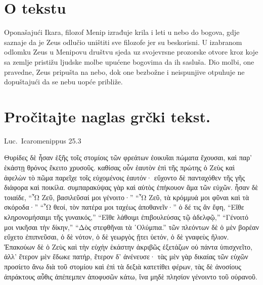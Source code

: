 


\section*{O tekstu}

Oponašajući Ikara, filozof Menip izrađuje krila i leti u nebo do bogova, gdje saznaje da je Zeus odlučio uništiti sve filozofe jer su beskorisni. U izabranom odlomku Zeus u Menipovu društvu sjeda uz svojevrsne prozorske otvore kroz koje sa zemlje pristižu ljudske molbe upućene bogovima da ih sasluša. Dio molbi, one pravedne, Zeus pripušta na nebo, dok one bezbožne i neispunjive otpuhuje ne dopuštajući da se nebu uopće približe.


\section*{Pročitajte naglas grčki tekst.}

Luc.\ Icaromenippus 25.3

\medskip

{\large
\begin{greek}
\noindent Θυρίδες δὲ ἦσαν ἑξῆς τοῖς στομίοις τῶν φρεάτων ἐοικυῖαι πώματα ἔχουσαι, καὶ παρ' ἑκάστῃ θρόνος ἔκειτο χρυσοῦς. καθίσας οὖν ἑαυτὸν ἐπὶ τῆς πρώτης ὁ Ζεὺς καὶ ἀφελὼν τὸ πῶμα παρεῖχε τοῖς εὐχομένοις ἑαυτόν· εὔχοντο δὲ πανταχόθεν τῆς γῆς διάφορα καὶ ποικίλα. συμπαρακύψας γὰρ καὶ αὐτὸς ἐπήκουον ἅμα τῶν εὐχῶν. ἦσαν δὲ τοιαίδε, ``῏Ω Ζεῦ, βασιλεῦσαί μοι γένοιτο·'' ``῏Ω Ζεῦ, τὰ κρόμμυά μοι φῦναι καὶ τὰ σκόροδα·'' ``῏Ω θεοί, τὸν πατέρα μοι ταχέως ἀποθανεῖν·'' ὁ δέ τις ἂν ἔφη, ``Εἴθε κληρονομήσαιμι τῆς γυναικός,'' ``Εἴθε λάθοιμι ἐπιβουλεύσας τῷ ἀδελφῷ,'' ``Γένοιτό μοι νικῆσαι τὴν δίκην,'' ``Δὸς στεφθῆναι τὰ ᾿Ολύμπια.'' τῶν πλεόντων δὲ ὁ μὲν βορέαν εὔχετο ἐπιπνεῦσαι, ὁ δὲ νότον, ὁ δὲ γεωργὸς ᾔτει ὑετόν, ὁ δὲ γναφεὺς ἥλιον. Ἐπακούων δὲ ὁ Ζεὺς καὶ τὴν εὐχὴν ἑκάστην ἀκριβῶς ἐξετάζων οὐ πάντα ὑπισχνεῖτο, ἀλλ' ἕτερον μὲν ἔδωκε πατήρ, ἕτερον δ' ἀνένευσε· τὰς μὲν γὰρ δικαίας τῶν εὐχῶν προσίετο ἄνω διὰ τοῦ στομίου καὶ ἐπὶ τὰ δεξιὰ κατετίθει φέρων, τὰς δὲ ἀνοσίους ἀπράκτους αὖθις ἀπέπεμπεν ἀποφυσῶν κάτω, ἵνα μηδὲ πλησίον γένοιντο τοῦ οὐρανοῦ. 
\end{greek}

}

